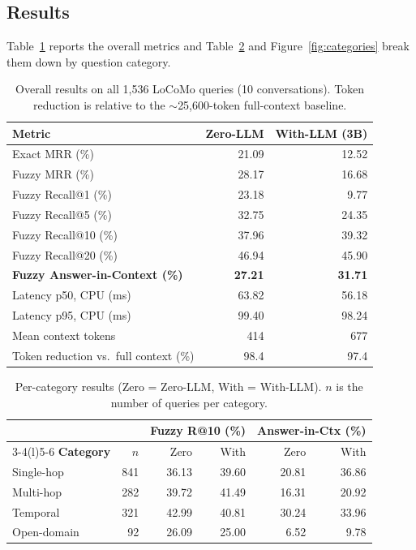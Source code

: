 \documentclass[11pt]{article}
\begin{document}
\subsection{Results}
Table~\ref{tab:main} reports the overall metrics and Table~\ref{tab:cat} and Figure~\ref{fig:categories} break them down by question category.

\begin{table}[t]
\centering
\small
\renewcommand{\arraystretch}{1.12}
\begin{tabular}{@{}lrr@{}}
\toprule
\textbf{Metric} & \textbf{Zero-LLM} & \textbf{With-LLM (3B)}\\
\midrule
Exact MRR (\%) & 21.09 & 12.52\\
Fuzzy MRR (\%) & 28.17 & 16.68\\
Fuzzy Recall@1 (\%) & 23.18 & 9.77\\
Fuzzy Recall@5 (\%) & 32.75 & 24.35\\
Fuzzy Recall@10 (\%) & 37.96 & 39.32\\
Fuzzy Recall@20 (\%) & 46.94 & 45.90\\
\textbf{Fuzzy Answer-in-Context (\%)} & \textbf{27.21} & \textbf{31.71}\\
\midrule
Latency p50, CPU (ms) & 63.82 & 56.18\\
Latency p95, CPU (ms) & 99.40 & 98.24\\
Mean context tokens & 414 & 677\\
Token reduction vs.\ full context (\%) & 98.4 & 97.4\\
\bottomrule
\end{tabular}
\caption{Overall results on all 1,536 LoCoMo queries (10 conversations). Token reduction is relative to the $\sim$25,600-token full-context baseline.}
\label{tab:main}
\end{table}

\begin{table}[t]
\centering
\small
\setlength{\tabcolsep}{7pt}
\renewcommand{\arraystretch}{1.12}
\begin{tabular}{@{}l r rr rr@{}}
\toprule
 & & \multicolumn{2}{c}{\textbf{Fuzzy R@10 (\%)}} & \multicolumn{2}{c}{\textbf{Answer-in-Ctx (\%)}}\\
\cmidrule(lr){3-4}\cmidrule(l){5-6}
\textbf{Category} & $n$ & Zero & With & Zero & With\\
\midrule
Single-hop  & 841 & 36.13 & 39.60 & 20.81 & 36.86\\
Multi-hop   & 282 & 39.72 & 41.49 & 16.31 & 20.92\\
Temporal    & 321 & 42.99 & 40.81 & 30.24 & 33.96\\
Open-domain &  92 & 26.09 & 25.00 &  6.52 &  9.78\\
\bottomrule
\end{tabular}
\caption{Per-category results (Zero = Zero-LLM, With = With-LLM). $n$ is the number of queries per category.}
\label{tab:cat}
\end{table}
\end{document}
